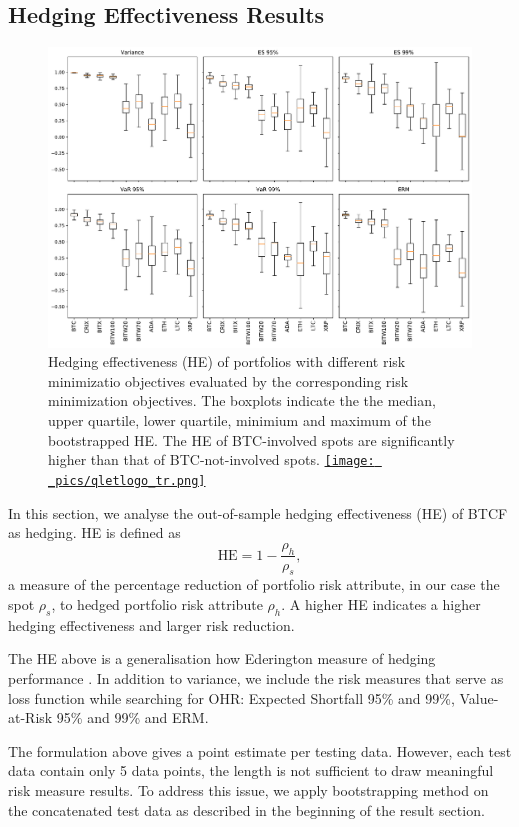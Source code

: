 \subsection{Hedging Effectiveness Results}\label{sec: HE results}
\begin{figure}[t]
\includegraphics[width=\textwidth]{_pics/ES5_HE_boxplot.pdf}
  \caption{Hedging effectiveness (HE) of portfolios with different risk minimizatio objectives evaluated by the corresponding risk minimization objectives.
            The boxplots indicate the the median, upper quartile, lower quartile, minimium and maximum of the bootstrapped HE.
            The HE of BTC-involved spots are significantly higher than that of BTC-not-involved spots.
  \href{http://www.quantlet.com/}{\texttt{[image: \_pics/qletlogo\_tr.png]}} }
\label{fig:HEboxplot}
\end{figure}
In this section, we analyse the out-of-sample hedging effectiveness (HE) of BTCF as hedging.
HE is defined as $$\text{HE} = 1-\frac{\rho_h}{\rho_s},$$
a measure of the percentage reduction of portfolio risk attribute, in our case the spot $\rho_s$,
to hedged portfolio risk attribute $\rho_h$.
A higher HE indicates a higher hedging effectiveness and larger risk reduction. \medskip

The HE above is a generalisation how Ederington measure of hedging performance \citep{ederington1979hedging}.
In addition to variance, we include the risk measures that serve as loss function while searching for OHR: Expected
Shortfall 95\% and 99\%, Value-at-Risk 95\% and 99\% and ERM.

The formulation above gives a point estimate per testing data.
However, each test data contain only 5 data points, the length is not sufficient to draw meaningful risk measure results.
To address this issue, we apply bootstrapping method on the concatenated test data as described in the beginning of the result section. \medskip

